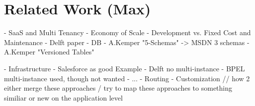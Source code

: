 \section{Related Work (Max)}
\label{sec:relatedwork}

- SaaS and Multi Tenancy
  - Economy of Scale
    - Development vs. Fixed Cost and Maintenance
    - Delft paper
- DB
  - A.Kemper "5-Schemas" -> MSDN 3 schemas
  - A.Kemper "Versioned Tables"

- Infrastructure
  - Salesforce as good Example
  - Delft no multi-instance
  - BPEL multi-instance used, though not wanted
- ...
  - Routing
  - Customization // how 2 either merge these approaches / try to map these approaches to something similiar or new on the application level